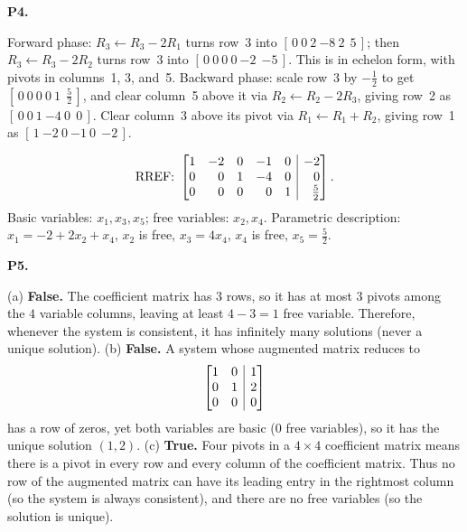 \documentclass[10pt]{scrartcl}
\makeatletter
\newcommand{\aug}[2]{\left[\begin{array}{@{}#1@{}}#2\end{array}\right]}
\makeatother
\begin{document}
\begin{prob}\textbf{P4.}\par{}
\begin{steps}
  \ii Forward phase: $R_3\leftarrow R_3-2R_1$ turns row~3 into $[\,0\ 0\ 2\ {-8}\ 2\ \ 5\,]$; then $R_3\leftarrow R_3-2R_2$ turns row~3 into $[\,0\ 0\ 0\ 0\ {-2}\ \ {-5}\,]$. This is in echelon form, with pivots in columns~1, 3, and~5.
  \ii Backward phase: scale row~3 by $-\tfrac12$ to get $[\,0\ 0\ 0\ 0\ 1\ \ \tfrac52\,]$, and clear column~5 above it via $R_2\leftarrow R_2-2R_3$, giving row~2 as $[\,0\ 0\ 1\ {-4}\ 0\ \ 0\,]$.
  \ii Clear column~3 above its pivot via $R_1\leftarrow R_1+R_2$, giving row~1 as $[\,1\ {-2}\ 0\ {-1}\ 0\ \ {-2}\,]$.
\end{steps}
\[
  \text{RREF: }\aug{rrrrr|r}{1&-2&0&-1&0&-2\\0&0&1&-4&0&0\\0&0&0&0&1&\tfrac52}.
\]
Basic variables: $x_1,x_3,x_5$; free variables: $x_2,x_4$. Parametric description: $x_1=-2+2x_2+x_4$, $x_2$ is free, $x_3=4x_4$, $x_4$ is free, $x_5=\tfrac52$.
\end{prob}

\begin{prob}\textbf{P5.}
\begin{steps}
  \ii (a) \textbf{False.} The coefficient matrix has $3$ rows, so it has at most $3$ pivots among the $4$ variable columns, leaving at least $4-3=1$ free variable. Therefore, whenever the system is consistent, it has infinitely many solutions (never a unique solution).
  \ii (b) \textbf{False.} A system whose augmented matrix reduces to
  \[
    \aug{rr|r}{1&0&1\\0&1&2\\0&0&0}
  \]
  has a row of zeros, yet both variables are basic ($0$ free variables), so it has the unique solution $(1,2)$.
  \ii (c) \textbf{True.} Four pivots in a $4\times4$ coefficient matrix means there is a pivot in every row and every column of the coefficient matrix. Thus no row of the augmented matrix can have its leading entry in the rightmost column (so the system is always consistent), and there are no free variables (so the solution is unique).
\end{steps}
\end{prob}
\end{document}
